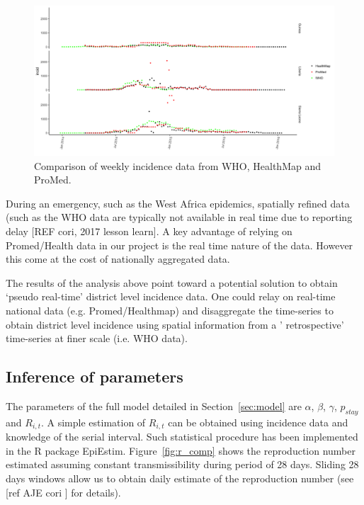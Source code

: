 \documentclass[11pt,]{article}
\begin{document}
\begin{figure}
    \centering
        \includegraphics[]{ms6-figures/who_hm_pm_weekly_incid-1}
        \caption{Comparison of weekly incidence data from WHO, HealthMap and ProMed.}
        \label{fig:incid_comp}
  \end{figure}

During an emergency, such as the West Africa epidemics, spatially refined data (such as the WHO data
are typically not available in real time due to reporting delay [REF cori, 2017 lesson learn]. A key advantage 
of relying on Promed/Health data in our project is the real time nature of the data. However this come at the cost
of nationally aggregated data.

The results of the analysis above point toward a potential solution to obtain `pseudo real-time' district
 level incidence data. One could relay on real-time national data (e.g. Promed/Healthmap) and disaggregate 
the time-series to obtain district level incidence using spatial information from a ' retrospective'
time-series at finer scale (i.e. WHO data).
\FloatBarrier
\subsection{Inference of parameters}

The parameters of the full model detailed in Section~\ref{sec:model} are
$\alpha$, $\beta$, $\gamma$, $p_{stay}$ and $R_{i, t}$. A simple
estimation of $R_{i, t}$ can be obtained using incidence data and knowledge of the serial interval.
Such statistical procedure has been implemented in the
R package EpiEstim. Figure~\ref{fig:r_comp} shows the
reproduction number estimated assuming constant transmissibility during period of 28 days. 
Sliding  28 days windows allow us to obtain daily estimate of the reproduction number (see [ref AJE cori ] for details).
\end{document}
